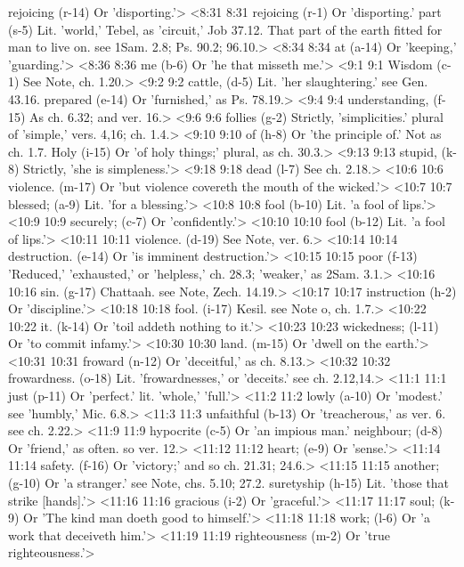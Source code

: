   rejoicing (r-14) Or 'disporting.'>
<8:31 8:31  rejoicing (r-1)  Or 'disporting.'
  part (s-5)  Lit. 'world,' Tebel, as 'circuit,' Job 37.12. That part of  the earth fitted for man to live on. see 1Sam. 2.8; Ps. 90.2; 96.10.>
<8:34 8:34  at (a-14)  Or 'keeping,' 'guarding.'>
<8:36 8:36  me (b-6)  Or 'he that misseth me.'>
<9:1 9:1  Wisdom (c-1)  See Note, ch. 1.20.>
<9:2 9:2  cattle, (d-5)  Lit. 'her slaughtering.' see Gen. 43.16.
  prepared (e-14)  Or 'furnished,' as Ps. 78.19.>
<9:4 9:4  understanding, (f-15)  As ch. 6.32; and ver. 16.>
<9:6 9:6  follies (g-2)  Strictly, 'simplicities.' plural of 'simple,' vers. 4,16; ch. 1.4.>
<9:10 9:10  of (h-8)  Or 'the principle of.' Not as ch. 1.7.
  Holy (i-15)  Or 'of holy things;' plural, as ch. 30.3.>
<9:13 9:13  stupid, (k-8)  Strictly, 'she is simpleness.'>
<9:18 9:18  dead (l-7)  See ch. 2.18.>
<10:6 10:6  violence. (m-17)  Or 'but violence covereth the mouth of the wicked.'>
<10:7 10:7  blessed; (a-9)  Lit. 'for a blessing.'>
<10:8 10:8  fool (b-10) Lit. 'a fool of lips.'>
<10:9 10:9  securely; (c-7)  Or 'confidently.'>
<10:10 10:10  fool (b-12)  Lit. 'a fool of lips.'>
<10:11 10:11  violence. (d-19)  See Note, ver. 6.>
<10:14 10:14  destruction. (e-14)  Or 'is imminent destruction.'>
<10:15 10:15  poor (f-13)  'Reduced,' 'exhausted,' or 'helpless,' ch. 28.3; 'weaker,' as 2Sam. 3.1.>
<10:16 10:16  sin. (g-17)  Chattaah. see Note, Zech. 14.19.>
<10:17 10:17  instruction (h-2)  Or 'discipline.'>
<10:18 10:18  fool. (i-17)  Kesil. see Note o, ch. 1.7.>
<10:22 10:22  it. (k-14)  Or 'toil addeth nothing to it.'>
<10:23 10:23  wickedness; (l-11)  Or 'to commit infamy.'>
<10:30 10:30  land. (m-15)  Or 'dwell on the earth.'>
<10:31 10:31  froward (n-12)  Or 'deceitful,' as ch. 8.13.>
<10:32 10:32  frowardness. (o-18)  Lit. 'frowardnesses,' or 'deceits.' see ch. 2.12,14.>
<11:1 11:1  just (p-11)  Or 'perfect.' lit. 'whole,' 'full.'>
<11:2 11:2  lowly (a-10)  Or 'modest.' see 'humbly,' Mic. 6.8.>
<11:3 11:3  unfaithful (b-13)  Or 'treacherous,' as ver. 6. see ch. 2.22.>
<11:9 11:9  hypocrite (c-5)  Or 'an impious man.'
  neighbour; (d-8)  Or 'friend,' as often. so ver. 12.>
<11:12 11:12  heart; (e-9)  Or 'sense.'>
<11:14 11:14  safety. (f-16)  Or 'victory;' and so ch. 21.31; 24.6.>
<11:15 11:15  another; (g-10)  Or 'a stranger.' see Note, chs. 5.10; 27.2.
  suretyship (h-15)  Lit. 'those that strike [hands].'>
<11:16 11:16  gracious (i-2)  Or 'graceful.'>
<11:17 11:17  soul; (k-9)  Or 'The kind man doeth good to himself.'>
<11:18 11:18  work; (l-6)  Or 'a work that deceiveth him.'>
<11:19 11:19  righteousness (m-2)  Or 'true righteousness.'>
